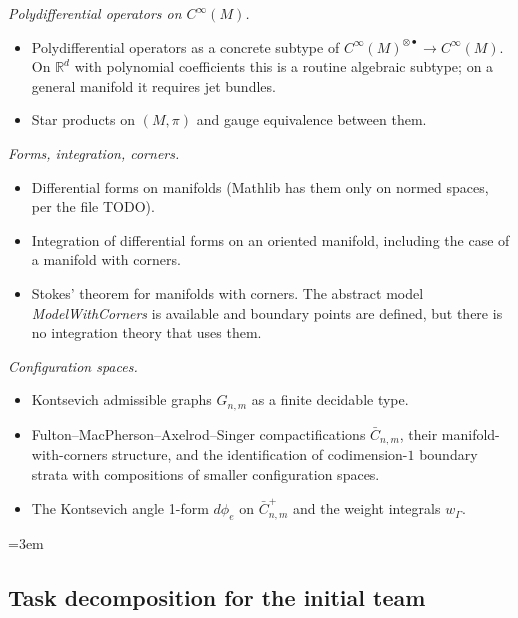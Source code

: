 \documentclass[11pt,a4paper]{article}
\theoremstyle{definition}
\newcommand{\R}{\mathbb{R}}
\newcommand{\Cinfty}{C^{\infty}}
\begin{document}
\emph{Polydifferential operators on $\Cinfty(M)$.}
\begin{itemize}[leftmargin=2em]
  \item Polydifferential operators as a concrete subtype of
        $\Cinfty(M)^{\otimes\bullet} \to \Cinfty(M)$. On $\R^{d}$
        with polynomial coefficients this is a routine algebraic
        subtype; on a general manifold it requires jet bundles.
  \item Star products on $(M,\pi)$ and gauge equivalence between
        them.
\end{itemize}

\emph{Forms, integration, corners.}
\begin{itemize}[leftmargin=2em]
  \item Differential forms on manifolds (Mathlib has them only on
        normed spaces, per the file 
        TODO).
  \item Integration of differential forms on an oriented manifold,
        including the case of a manifold with corners.
  \item Stokes' theorem for manifolds with corners. The abstract
        model \emph{ModelWithCorners} is available and boundary points
        are defined, but there is no integration theory that uses
        them.
\end{itemize}

\emph{Configuration spaces.}
\begin{itemize}[leftmargin=2em]
  \item Kontsevich admissible graphs $G_{n,m}$ as a finite decidable
        type.
  \item Fulton--MacPherson--Axelrod--Singer compactifications
        $\bar C_{n,m}$, their manifold-with-corners structure, and
        the identification of codimension-$1$ boundary strata with
        compositions of smaller configuration spaces.
  \item The Kontsevich angle 1-form $d\phi_{e}$ on
        $\bar C_{n,m}^{+}$ and the weight integrals $w_{\Gamma}$.
\end{itemize}

\endgroup

\begingroup
\emergencystretch=3em

\subsection{Task decomposition for the initial team}\label{ssec:tasks}
\end{document}
